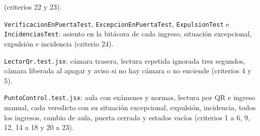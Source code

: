 {      (criterios 22 y 23).
\item \texttt{VerificacionEnPuertaTest}, \texttt{ExcepcionEnPuertaTest},
      \texttt{ExpulsionTest} e \texttt{IncidenciasTest}: asiento en la bitácora de cada
      ingreso, situación excepcional, expulsión e incidencia (criterio 24).
\item \texttt{LectorQr.test.jsx}: cámara trasera, lectura repetida ignorada tres
      segundos, cámara liberada al apagar y aviso si no hay cámara o no enciende
      (criterios 4 y 5).
\item \texttt{PuntoControl.test.jsx}: aula con exámenes y normas, lectura por QR e ingreso
      manual, cada veredicto con su situación excepcional, expulsión, incidencia, todos
      los ingresos, cambio de aula, puerta cerrada y estados vacíos (criterios 1 a 6, 9,
      12, 14 a 18 y 20 a 23).}


